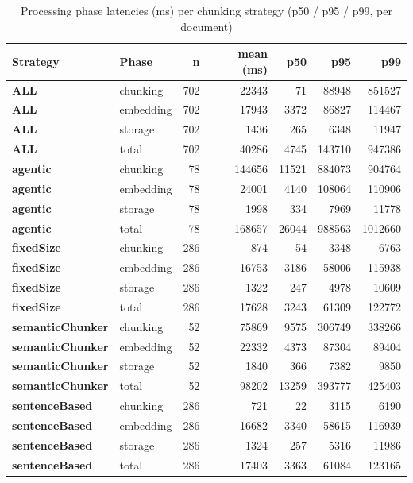 \begin{table}[H]
\centering
\caption{Processing phase latencies (ms) per chunking strategy (p50 / p95 / p99, per document)}
\small
\begin{tabular}{@{}llrrrrr@{}}
\toprule
\textbf{Strategy} & \textbf{Phase} & \textbf{n} & \textbf{mean (ms)} & \textbf{p50} & \textbf{p95} & \textbf{p99} \\
\midrule
\textbf{ALL} & chunking & 702 & 22343 & 71 & 88948 & 851527 \\
\textbf{ALL} & embedding & 702 & 17943 & 3372 & 86827 & 114467 \\
\textbf{ALL} & storage & 702 & 1436 & 265 & 6348 & 11947 \\
\textbf{ALL} & total & 702 & 40286 & 4745 & 143710 & 947386 \\
\textbf{agentic} & chunking & 78 & 144656 & 11521 & 884073 & 904764 \\
\textbf{agentic} & embedding & 78 & 24001 & 4140 & 108064 & 110906 \\
\textbf{agentic} & storage & 78 & 1998 & 334 & 7969 & 11778 \\
\textbf{agentic} & total & 78 & 168657 & 26044 & 988563 & 1012660 \\
\textbf{fixedSize} & chunking & 286 & 874 & 54 & 3348 & 6763 \\
\textbf{fixedSize} & embedding & 286 & 16753 & 3186 & 58006 & 115938 \\
\textbf{fixedSize} & storage & 286 & 1322 & 247 & 4978 & 10609 \\
\textbf{fixedSize} & total & 286 & 17628 & 3243 & 61309 & 122772 \\
\textbf{semanticChunker} & chunking & 52 & 75869 & 9575 & 306749 & 338266 \\
\textbf{semanticChunker} & embedding & 52 & 22332 & 4373 & 87304 & 89404 \\
\textbf{semanticChunker} & storage & 52 & 1840 & 366 & 7382 & 9850 \\
\textbf{semanticChunker} & total & 52 & 98202 & 13259 & 393777 & 425403 \\
\textbf{sentenceBased} & chunking & 286 & 721 & 22 & 3115 & 6190 \\
\textbf{sentenceBased} & embedding & 286 & 16682 & 3340 & 58615 & 116939 \\
\textbf{sentenceBased} & storage & 286 & 1324 & 257 & 5316 & 11986 \\
\textbf{sentenceBased} & total & 286 & 17403 & 3363 & 61084 & 123165 \\
\bottomrule
\end{tabular}
\end{table}
